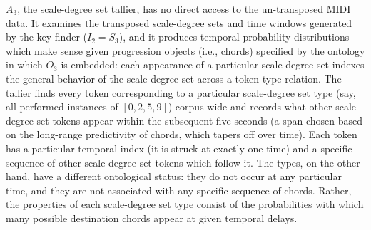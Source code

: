 $A_3$, the scale-degree set tallier, has no direct access to the un-transposed MIDI data.  It examines the transposed scale-degree sets and time windows generated by the key-finder ($I_2 = S_3$), and it produces temporal probability distributions which make sense given progression objects (i.e., chords) specified by the ontology in which $O_3$ is embedded: each appearance of a particular scale-degree set indexes the general behavior of the scale-degree set across a token-type relation.  The tallier finds every token corresponding to a particular scale-degree set type (say, all performed instances of $[0,2,5,9]$) corpus-wide and records what other scale-degree set tokens appear within the subsequent five seconds (a span chosen based on the long-range predictivity of chords, which tapers off over time).  Each token has a particular temporal index (it is struck at exactly one time) and a specific sequence of other scale-degree set tokens which follow it.  The types, on the other hand, have a different ontological status: they do not occur at any particular time, and they are not associated with any specific sequence of chords.  Rather, the properties of each scale-degree set type consist of the probabilities with which many possible destination chords appear at given temporal delays.

